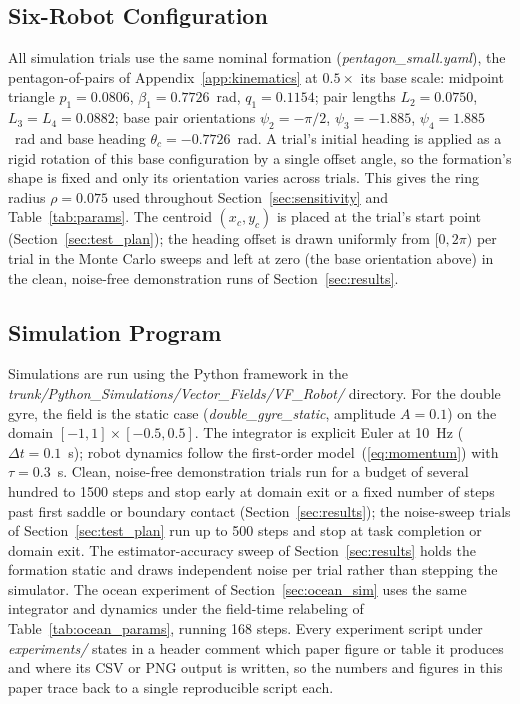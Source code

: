 \documentclass[lettersize,journal]{IEEEtran}
\begin{document}
\subsection{Six-Robot Configuration}

All simulation trials use the same nominal formation
(\textit{pentagon\_small.yaml}), the pentagon-of-pairs of
Appendix~\ref{app:kinematics} at $0.5\times$ its base scale: midpoint
triangle $p_1 = 0.0806$, $\beta_1 = 0.7726$~rad, $q_1 = 0.1154$; pair
lengths $L_2 = 0.0750$, $L_3 = L_4 = 0.0882$; base pair orientations
$\psi_2 = -\pi/2$, $\psi_3 = -1.885$, $\psi_4 = 1.885$~rad and base
heading $\theta_c = -0.7726$~rad. A trial's initial heading is applied
as a rigid rotation of this base configuration by a single offset
angle, so the formation's shape is fixed and only its orientation
varies across trials. This gives the ring radius $\rho = 0.075$ used
throughout Section~\ref{sec:sensitivity} and Table~\ref{tab:params}.
The centroid $(x_c, y_c)$ is placed at the trial's start point
(Section~\ref{sec:test_plan}); the heading offset is drawn uniformly
from $[0, 2\pi)$ per trial in the Monte Carlo sweeps and left at zero
(the base orientation above) in the clean, noise-free demonstration
runs of Section~\ref{sec:results}.

\subsection{Simulation Program}

Simulations are run using the Python framework in the
\textit{trunk/Python\_Simulations/Vector\_Fields/VF\_Robot/} directory.
For the double gyre, the field is the static case
(\textit{double\_gyre\_static}, amplitude $A = 0.1$) on the domain
$[-1, 1] \times [-0.5, 0.5]$. The integrator is explicit Euler at
10~Hz ($\Delta t = 0.1$~s); robot dynamics follow the first-order
model~(\ref{eq:momentum}) with $\tau = 0.3$~s. Clean, noise-free
demonstration trials run for a budget of several hundred to 1500 steps
and stop early at domain exit or a fixed number of steps past first
saddle or boundary contact (Section~\ref{sec:results}); the noise-sweep trials of
Section~\ref{sec:test_plan} run up to 500 steps and stop at task
completion or domain exit. The estimator-accuracy sweep of
Section~\ref{sec:results} holds the formation static and draws
independent noise per trial rather than stepping the simulator. The
ocean experiment of Section~\ref{sec:ocean_sim} uses the same
integrator and dynamics under the field-time relabeling of
Table~\ref{tab:ocean_params}, running 168 steps. Every experiment
script under \textit{experiments/} states in a header comment which
paper figure or table it produces and where its CSV or PNG output is
written, so the numbers and figures in this paper trace back to a
single reproducible script each.
\end{document}
